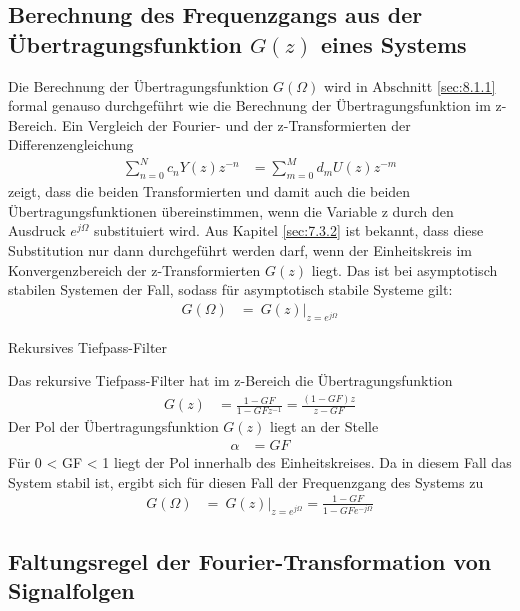 \subsection{Berechnung des Frequenzgangs aus der Übertragungsfunktion \(G(z)\) eines Systems}\label{sec:berechnung-des-frequenzgangs-aus-der-uxfcbertragungsfunktion-gz-eines-systems}

Die Berechnung der Übertragungsfunktion \(G(Ω)\) wird in Abschnitt \ref{sec:8.1.1} formal genauso durchgeführt wie die Berechnung der Übertragungsfunktion im z-Bereich. Ein Vergleich der Fourier- und der z-Transformierten der Differenzengleichung
\begin{align}
\sum\limits_{n = 0}^{N}{c_{n}  Y(z)  z^{- n}} &= \sum\limits_{m = 0}^{M}{d_{m}  U(z)  z^{- m}} \label{eq:8.7}
\end{align}
zeigt, dass die beiden Transformierten und damit auch die beiden Übertragungsfunktionen übereinstimmen, wenn die Variable z durch den Ausdruck \(e^{jΩ}\) substituiert wird. Aus Kapitel \ref{sec:7.3.2} ist bekannt, dass diese Substitution nur dann durchgeführt werden darf, wenn der Einheitskreis im Konvergenzbereich der z-Transformierten \(G(z)\) liegt. Das ist bei asymptotisch stabilen Systemen der Fall, sodass für asymptotisch stabile Systeme gilt:
\begin{align}
G(\Omega) &= \left. \ G(z) \right|_{z = e^{j  \Omega}} \label{eq:8.8}
\end{align}
\begin{example}{Rekursives Tiefpass-Filter}
\label{example:beispiel-rekursives-tiefpass-filter-1}

Das rekursive Tiefpass-Filter hat im z-Bereich die Übertragungsfunktion
\begin{align*}
G(z) &= \frac{1 - GF}{1 - GF  z^{- 1}} = \frac{(1 - GF)  z}{z - GF} 
\end{align*}
Der Pol der Übertragungsfunktion \(G(z)\) liegt an der Stelle
\begin{align*}
\alpha &= GF 
\end{align*}
Für 0 \textless{} GF \textless{} 1 liegt der Pol innerhalb des Einheitskreises. Da in diesem Fall das System stabil ist, ergibt sich für diesen Fall der Frequenzgang des Systems zu
\begin{align*}
G(\Omega) &= \left. \ G(z) \right|_{z = e^{j  \Omega}} = \frac{1 - GF}{1 - GF  e^{- j  \Omega}} 
\end{align*}
\end{example}

\subsection{Faltungsregel der Fourier-Transformation von Signalfolgen}\label{sec:8.1.3}

